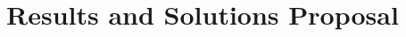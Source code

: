 \documentclass[Report.tex]{subfiles}
\begin{document}
\chapter{Results and Solutions Proposal}
\end{document}
